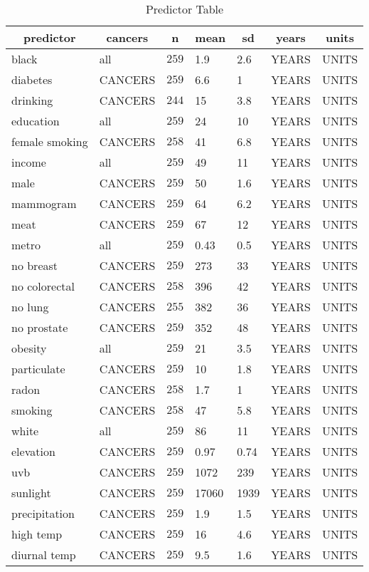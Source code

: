 \begin{table}[!tbp]
\caption{Predictor Table\label{tab:predictors}} 
\begin{center}
\begin{tabular}{llrllll}
\hline\hline
\multicolumn{1}{c}{predictor}&\multicolumn{1}{c}{cancers}&\multicolumn{1}{c}{n}&\multicolumn{1}{c}{mean}&\multicolumn{1}{c}{sd}&\multicolumn{1}{c}{years}&\multicolumn{1}{c}{units}\tabularnewline
\hline
black&all&$259$&1.9&2.6&YEARS&UNITS\tabularnewline
diabetes&CANCERS&$259$&6.6&1&YEARS&UNITS\tabularnewline
drinking&CANCERS&$244$&15&3.8&YEARS&UNITS\tabularnewline
education&all&$259$&24&10&YEARS&UNITS\tabularnewline
female smoking&CANCERS&$258$&41&6.8&YEARS&UNITS\tabularnewline
income&all&$259$&49&11&YEARS&UNITS\tabularnewline
male&CANCERS&$259$&50&1.6&YEARS&UNITS\tabularnewline
mammogram&CANCERS&$259$&64&6.2&YEARS&UNITS\tabularnewline
meat&CANCERS&$259$&67&12&YEARS&UNITS\tabularnewline
metro&all&$259$&0.43&0.5&YEARS&UNITS\tabularnewline
no breast&CANCERS&$259$&273&33&YEARS&UNITS\tabularnewline
no colorectal&CANCERS&$258$&396&42&YEARS&UNITS\tabularnewline
no lung&CANCERS&$255$&382&36&YEARS&UNITS\tabularnewline
no prostate&CANCERS&$259$&352&48&YEARS&UNITS\tabularnewline
obesity&all&$259$&21&3.5&YEARS&UNITS\tabularnewline
particulate&CANCERS&$259$&10&1.8&YEARS&UNITS\tabularnewline
radon&CANCERS&$258$&1.7&1&YEARS&UNITS\tabularnewline
smoking&CANCERS&$258$&47&5.8&YEARS&UNITS\tabularnewline
white&all&$259$&86&11&YEARS&UNITS\tabularnewline
elevation&CANCERS&$259$&0.97&0.74&YEARS&UNITS\tabularnewline
uvb&CANCERS&$259$&1072&239&YEARS&UNITS\tabularnewline
sunlight&CANCERS&$259$&17060&1939&YEARS&UNITS\tabularnewline
precipitation&CANCERS&$259$&1.9&1.5&YEARS&UNITS\tabularnewline
high temp&CANCERS&$259$&16&4.6&YEARS&UNITS\tabularnewline
diurnal temp&CANCERS&$259$&9.5&1.6&YEARS&UNITS\tabularnewline
\hline
\end{tabular}\end{center}

\end{table}
